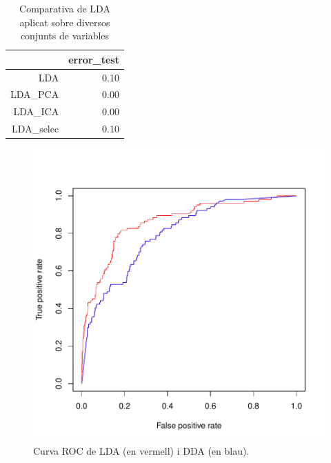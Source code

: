 \documentclass[a4paper,10pt]{article}
\begin{document}
\begin{table}[ht]
\begin{center}
\begin{tabular}{rr}
  \hline
 & error\_test \\ 
  \hline
LDA & 0.10 \\ 
  LDA\_PCA & 0.00 \\ 
  LDA\_ICA & 0.00 \\ 
  LDA\_selec & 0.10 \\ 
   \hline
\end{tabular}
\caption{Comparativa de LDA aplicat sobre diversos conjunts de variables}
\label{tab:error_da2}
\end{center}
\end{table}

\begin{center}
\begin{figure}
\includegraphics[width=5in]{memoria-da_roc}
\caption{Curva ROC de LDA (en vermell) i DDA (en blau).} \label{fig:da_roc}
\end{figure}
\end{center}
\end{document}

